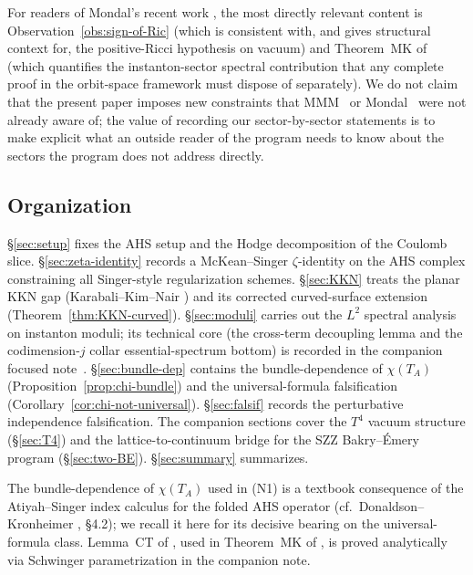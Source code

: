\documentclass[11pt,letterpaper]{article}
\theoremstyle{definition}
\begin{document}
For readers of Mondal's recent work \cite{Mondal2023,Mondal2308}, the most directly relevant content is Observation~\ref{obs:sign-of-Ric} (which is consistent with, and gives structural context for, the positive-Ricci hypothesis on vacuum) and Theorem~MK of \cite{bonfioli-core} (which quantifies the instanton-sector spectral contribution that any complete proof in the orbit-space framework must dispose of separately). We do not claim that the present paper imposes new constraints that MMM~\cite{MMM2019} or Mondal~\cite{Mondal2023, Mondal2308} were not already aware of; the value of recording our sector-by-sector statements is to make explicit what an outside reader of the program needs to know about the sectors the program does not address directly.

\subsection{Organization}

\S\ref{sec:setup} fixes the AHS setup and the Hodge decomposition of the Coulomb slice. \S\ref{sec:zeta-identity} records a McKean--Singer $\zeta$-identity on the AHS complex constraining all Singer-style regularization schemes. \S\ref{sec:KKN} treats the planar KKN gap (Karabali--Kim--Nair \cite{KKN1998}) and its corrected curved-surface extension (Theorem~\ref{thm:KKN-curved}). \S\ref{sec:moduli} carries out the $L^2$ spectral analysis on instanton moduli; its technical core (the cross-term decoupling lemma and the codimension-$j$ collar essential-spectrum bottom) is recorded in the companion focused note~\cite{bonfioli-core}. \S\ref{sec:bundle-dep} contains the bundle-dependence of $\chi(T_A)$ (Proposition~\ref{prop:chi-bundle}) and the universal-formula falsification (Corollary~\ref{cor:chi-not-universal}). \S\ref{sec:falsif} records the perturbative independence falsification. The companion sections cover the $T^4$ vacuum structure (\S\ref{sec:T4}) and the lattice-to-continuum bridge for the SZZ Bakry--\'Emery program (\S\ref{sec:two-BE}). \S\ref{sec:summary} summarizes.

The bundle-dependence of $\chi(T_A)$ used in (N1) is a textbook consequence of the Atiyah--Singer index calculus for the folded AHS operator (cf.\ Donaldson--Kronheimer \cite{DK1990}, \S 4.2); we recall it here for its decisive bearing on the universal-formula class. Lemma~CT of \cite{bonfioli-core}, used in Theorem~MK of \cite{bonfioli-core}, is proved analytically via Schwinger parametrization in the companion note.
\end{document}
